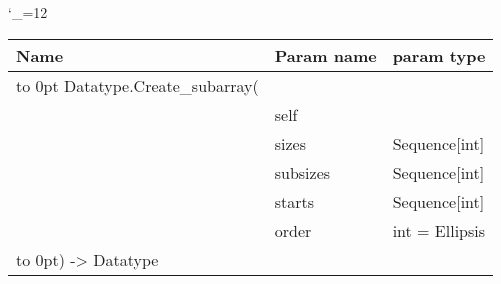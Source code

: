 \begingroup \catcode`\_=12 \tt
\begin{tabular}{lll}
\toprule
\textrm{Name}&\textrm{Param name}&\textrm{param type}\\
\midrule
\hbox to 0pt {Datatype.Create_subarray(\hss}\\
& self\\
& sizes & Sequence[int]\\
& subsizes & Sequence[int]\\
& starts & Sequence[int]\\
& order & int = Ellipsis\\
\hbox to 0pt{) -> Datatype\hss}\\
\bottomrule
\end{tabular}
\endgroup
